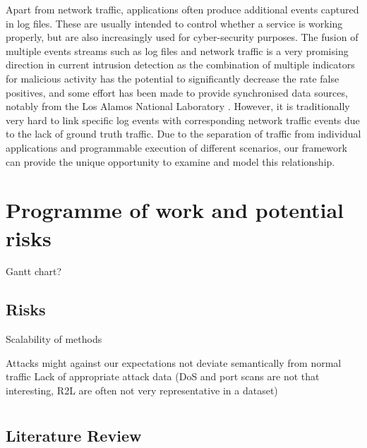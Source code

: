 \documentclass[a4paper,12pt,twoside]{report}
\begin{document}
Apart from network traffic, applications often produce additional events captured in log files. These are usually intended to control whether a service is working properly, but are also increasingly used for cyber-security purposes. The fusion of multiple events streams such as log files and network traffic is a very promising direction in current intrusion detection as the combination of multiple indicators for malicious activity has the potential to significantly decrease the rate false positives, and some effort has been made to provide synchronised data sources, notably from the Los Alamos National Laboratory \cite{kent-2015-cyberdata1}. However, it is traditionally very hard to link specific log events with corresponding network traffic events due to the lack of ground truth traffic. Due to the separation of traffic from individual applications and programmable execution of different scenarios, our framework can provide the unique opportunity to examine and model this relationship. %


\chapter{Programme of work and potential risks}

Gantt chart?

\section{Risks}

Scalability of methods


Attacks might against our expectations not deviate semantically from normal traffic
Lack of appropriate attack data (DoS and port scans are not that interesting, R2L are often not very representative in a dataset)



\appendix
\chapter{}
\section{Literature Review}\label{litreview}



\end{document}
